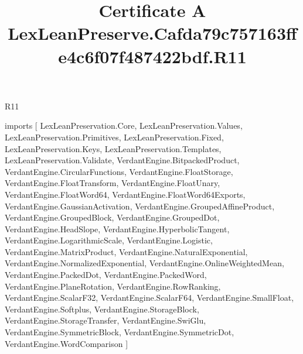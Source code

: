 \begin{lexlean}{R11}
\title{Certificate A LexLeanPreserve.Cafda79c757163ffe4c6f07f487422bdf.R11}
\begin{coremodule}
imports [
  LexLeanPreservation.Core,
  LexLeanPreservation.Values,
  LexLeanPreservation.Primitives,
  LexLeanPreservation.Fixed,
  LexLeanPreservation.Keys,
  LexLeanPreservation.Templates,
  LexLeanPreservation.Validate,
  VerdantEngine.BitpackedProduct,
  VerdantEngine.CircularFunctions,
  VerdantEngine.FloatStorage,
  VerdantEngine.FloatTransform,
  VerdantEngine.FloatUnary,
  VerdantEngine.FloatWord64,
  VerdantEngine.FloatWord64Exports,
  VerdantEngine.GaussianActivation,
  VerdantEngine.GroupedAffineProduct,
  VerdantEngine.GroupedBlock,
  VerdantEngine.GroupedDot,
  VerdantEngine.HeadSlope,
  VerdantEngine.HyperbolicTangent,
  VerdantEngine.LogarithmicScale,
  VerdantEngine.Logistic,
  VerdantEngine.MatrixProduct,
  VerdantEngine.NaturalExponential,
  VerdantEngine.NormalizedExponential,
  VerdantEngine.OnlineWeightedMean,
  VerdantEngine.PackedDot,
  VerdantEngine.PackedWord,
  VerdantEngine.PlaneRotation,
  VerdantEngine.RowRanking,
  VerdantEngine.ScalarF32,
  VerdantEngine.ScalarF64,
  VerdantEngine.SmallFloat,
  VerdantEngine.Softplus,
  VerdantEngine.StorageBlock,
  VerdantEngine.StorageTransfer,
  VerdantEngine.SwiGlu,
  VerdantEngine.SymmetricBlock,
  VerdantEngine.SymmetricDot,
  VerdantEngine.WordComparison
]


\end{coremodule}
\end{lexlean}
